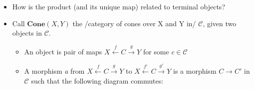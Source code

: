 \begin{itemize}
    \item How is the product (and its unique map) related to terminal objects?
    \item Call $\mathbf{Cone}(X,Y)$ the /category of cones over X and Y in/ $\mathcal{C}$, given two objects in $\mathcal{C}$.
          \begin{itemize}
            \item An object is pair of maps $X \xleftarrow{f}C\xrightarrow{g}Y$ for some $c \in \mathcal{C}$
            \item A morphism \emph{a} from  $X \xleftarrow{f}C\xrightarrow{g}Y$ to  $X \xleftarrow{f'}C\xrightarrow{g'}Y$ is a morphism $C \rightarrow C'$ in $\mathcal{C}$ such that the following diagram commutes: 

          \end{itemize}
  \end{itemize}
